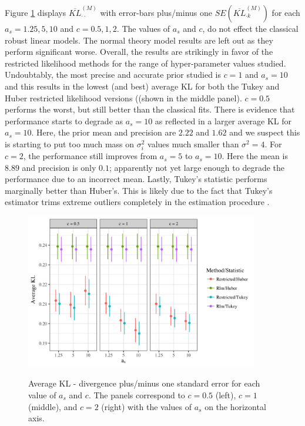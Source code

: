 \documentclass[ba]{imsart}
\begin{document}
Figure \ref{kl_sim} displays $\overline{KL}^{(M)}_{{\cdot}{\cdot}}$  with error-bars plus/minus one $SE(\overline{KL}^{(M)}_{{\cdot} k})$ for each $a_{s} = 1.25,  5, 10$ and $c = 0.5, 1, 2$. %
The values of $a_{s}$ and $c$, do not effect the classical robust linear models. The normal theory model results are left out as they perform significant worse. Overall, the results are strikingly in favor of the restricted likelihood methods for the range of hyper-parameter values studied. Undoubtably, the most precise and accurate prior studied is  $c = 1$ and $a_{s} = 10$  and this results in the lowest (and best) average KL for both the Tukey and Huber restricted likelihood versions ((shown in the middle panel). $c = 0.5$ performs the worst, but still better than the classical fits. There is evidence that performance starts to degrade as $a_{s} = 10$ as reflected in a larger average KL for $a_{s} = 10$. Here, the prior mean and precision are $2.22$ and $1.62$ and we suspect this is starting to put too much mass on $\sigma^{2}_{i}$ values much smaller than $\sigma^{2}=4$. For $c = 2$, the performance still improves from $a_{s} = 5$ to $a_{s} = 10$. Here the mean is $8.89$ and precision is only $0.1$; apparently not yet large enough to degrade the performance due to an incorrect mean. Lastly, Tukey's statistic performs marginally better than Huber's. This is likely due to the fact that Tukey's estimator trims extreme outliers completely in the estimation procedure \citep{huber2009}.
 
\begin{figure}[t]
\centering
\includegraphics[width = 4in]{kl_sim2_facet_scale.png}
\label{kl_sim}
\caption{Average KL - divergence plus/minus one standard error for each value of $a_{s}$ and $c$. The panels correspond to $c = 0.5$ (left), $c=1$ (middle), and $c=2$ (right) with the values of $a_{s}$ on the horizontal axis.}
\end{figure}
\end{document}
